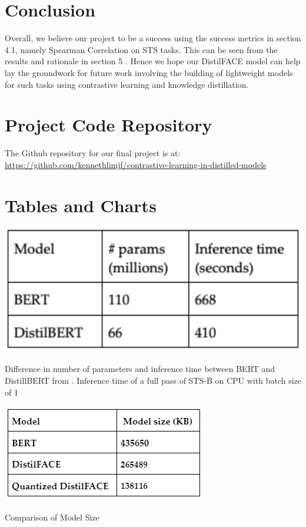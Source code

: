 \documentclass[10pt,twocolumn,letterpaper]{article}
\begin{document}
\section{Conclusion}

Overall, we believe our project to be a success using the success metrics  in section 4.1, namely Spearman Correlation on STS tasks. This can be seen from the results and rationale in section 5 . Hence we hope our DistilFACE model can help lay the groundwork for future work involving the building of lightweight models for such tasks using contrastive learning and knowledge distillation.



\small{


}


\begin{appendices}

\section{Project Code Repository}
The Github repository for our final project is at: \url{https://github.com/kennethlimjf/contrastive-learning-in-distilled-models}
\section{Tables and Charts}

\begin{table}[hbt!]
\centering
\includegraphics[scale=0.57]{images/Bert-distilbert-comparison.png}
\caption{Difference in number of parameters and inference time between BERT and DistillBERT from \cite{1910.01108}. Inference time of a full pass of STS-B on CPU with batch size of 1}
\label{fig:short}
\end{table}

\begin{table}[hbt!]
\centering
\includegraphics[scale=0.57]{images/Bert-distilFACE-size-comparison.png}
\caption{Comparison of Model Size}
\label{fig:short}
\end{table}


\end{appendices}
\end{document}
